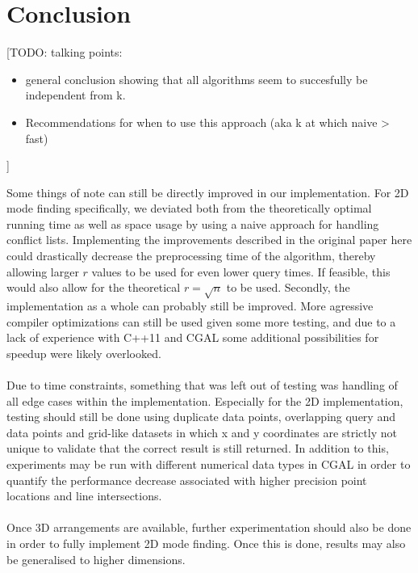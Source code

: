 \documentclass{article}
\newcommand{\todo}[1]{{\color{red}[#1]}}
\newcommand{\fb}[1]{{\color{blue}#1}}
\begin{document}
\section{Conclusion}
\todo{TODO: talking points:
    \begin{itemize}
        \item general conclusion showing that all algorithms seem to succesfully be
              independent from k.
        \item Recommendations for when to use this approach (aka k at which naive > fast)
    \end{itemize}
}

\fb{
    Some things of note can still be directly improved in our implementation. For 2D mode finding specifically, we deviated both from the theoretically optimal running time as well as space usage by using a naive approach for handling conflict lists. Implementing the improvements described in the original paper here could drastically decrease the preprocessing time of the algorithm, thereby allowing larger $r$ values to be used for even lower query times. If feasible, this would also allow for the theoretical $r=\sqrt{n}$ to be used. Secondly, the implementation as a whole can probably still be improved. More agressive compiler optimizations can still be used given some more testing, and due to a lack of experience with C++11 and CGAL some additional possibilities for speedup were likely overlooked. \\\\
    Due to time constraints, something that was left out of testing was handling of all edge cases within the implementation. Especially for the 2D implementation, testing should still be done using duplicate data points, overlapping query and data points and grid-like datasets in which x and y coordinates are strictly not unique to validate that the correct result is still returned. In addition to this, experiments may be run with different numerical data types in CGAL in order to quantify the performance decrease associated with higher precision point locations and line intersections. \\\\
    Once 3D arrangements are available, further experimentation should also be done in order to fully implement 2D mode finding. Once this is done, results may also be generalised to higher dimensions.
}
    
\printbibliography
\end{document}

